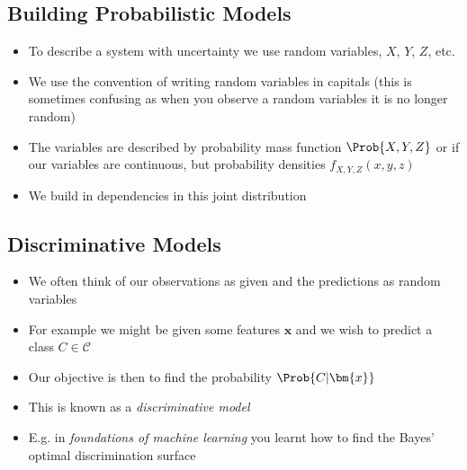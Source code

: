 \begin{slide}
\section{Building Probabilistic Models}

\begin{PauseHighLight}
  \begin{itemize}
  \item To describe a system with uncertainty we use random variables,
    $X$, $Y$, $Z$, etc.\pause
  \item We use the convention of writing random variables in capitals
    (this is sometimes confusing as when you observe a random variables
    it is no longer random)\pause
  \item The variables are described by probability mass function
    $\Prob{X,Y,Z}$ or if our variables are continuous, but probability
    densities $f_{X,Y,Z}(x,y,z)$\pause
  \item We build in dependencies in this joint distribution\pause
  \end{itemize}
\end{PauseHighLight}

\end{slide}


\begin{slide}
\section{Discriminative Models}

\begin{PauseHighLight}
  \begin{itemize}
  \item We often think of our observations as given and the predictions
    as random variables\pause
  \item For example we might be given some features $\bm{x}$ and we wish
    to predict a class $C\in\mathcal{C}$\pause
  \item Our objective is then to find the probability $\Prob{C|\bm{x}}$\pause
  \item This is known as a \emph{discriminative model}\pause
  \item E.g.{} in \textit{foundations of machine learning} you learnt how to
    find the Bayes' optimal discrimination surface\pause
  \end{itemize}
\end{PauseHighLight}

\end{slide}


